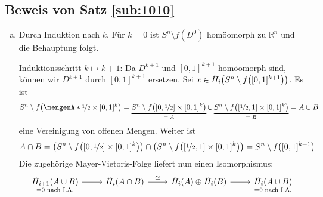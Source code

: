 \subsection{Beweis von Satz \ref{sub:1010}} %
\label{sub:beweis_von_satz_ref_sub_1010}
\begin{enumerate}[a)]
	\item Durch Induktion nach $k$. Für $k=0$ ist $S^n \setminus f(D^0)$ homöomorph zu $\mathds{R}^n$ und die Behauptung folgt.
	
	Induktionsschritt $k \mapsto k+1$: Da $D^{k+1}$ und $[0,1]^{k+1}$ homöomorph sind, können wir $D^{k+1}$ durch $[0,1]^{k+1}$ ersetzen. Sei 
	$x \in \tilde{H}_i \enbrace*{S^n \setminus f \enbrace*{[0,1]^{k+1}}}$. Es ist
	\[
		S^n \setminus f \enbrace*{\set{\nicefrac{1}{2}} \times [0,1]^{k}} = \underbracket[0.8pt][1pt]{S^n \setminus f \enbrace*{\benbrace*{0,\nicefrac{1}{2}}
		\times [0,1]^k}}_{=: A} \cup \underbracket[0.8pt][1pt]{S^n \setminus f \enbrace*{\benbrace*{\nicefrac{1}{2},1} \times [0,1]^k}}_{=: B} = A \cup B
	\]
	eine Vereinigung von offenen Mengen. Weiter ist 
	\begin{align*}
		A \cap B = \enbrace*{S^n \setminus f \enbrace*{\benbrace*{0,\nicefrac{1}{2} } \times [0,1]^k} } \cap \enbrace*{S^n \setminus f 
		\enbrace*{\benbrace*{\nicefrac{1}{2} ,1} \times [0,1]^k}} =   S^n \setminus f \enbrace*{[0,1]^{k+1}}
	\end{align*}
	Die zugehörige Mayer-Vietoris-Folge liefert nun einen Isomorphismus:
	\[
		\begin{tikzcd}
			\underset{=0 \text{ nach I.A.}}{\tilde{H}_{i+1}(A \cup B)} \rar & \tilde{H}_i(A \cap B) \rar["\cong"] & \tilde{H}_i(A) \oplus \tilde{H}_i(B) \rar & 
			\underset{=0 \text{ nach I.A.}}{\tilde{H}_i(A \cup B)}
		\end{tikzcd}
	\]

\end{enumerate}

